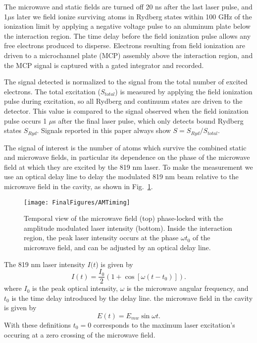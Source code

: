 \documentclass[aps,pra,preprint,groupedaddress]{revtex4-1}
\begin{document}
The microwave and static fields are turned off 20 ns after the last laser pulse, and 1$\mu$s later we field ionize surviving atoms in Rydberg states within 100 GHz of the ionization limit by applying a negative voltage pulse to an aluminum plate below the interaction region. The time delay before the field ionization pulse allows any free electrons produced to disperse. Electrons resulting from field ionization are driven to a microchannel plate (MCP) assembly above the interaction region, and the MCP signal is captured with a gated integrator and recorded.

The signal detected is normalized to the signal from the total number of excited electrons. The total excitation ($S_{total}$) is measured by applying the field ionization pulse during excitation, so all Rydberg and continuum states are driven to the detector. This value is compared to the signal observed when the field ionization pulse occurs 1 $\mu$s after the final laser pulse, which only detects bound Rydberg states $S_{Ryd}$. Signals reported in this paper always show $S = S_{Ryd} / S_{total}$.

The signal of interest is the number of atoms which survive the combined static and microwave fields, in particular its dependence on the phase of the microwave field at which they are excited by the 819 nm laser. To make the measurement we use an optical delay line to delay the modulated 819 nm beam relative to the microwave field in the cavity, as shown in Fig.~\ref{fig:AMLaser}.

\begin{figure}
	\texttt{[image: FinalFigures/AMTiming]}
	\caption{Temporal view of the microwave field (top) phase-locked with the amplitude modulated laser intensity (bottom). Inside the interaction region, the peak laser intensity occurs at the phase $\omega t_0$ of the microwave field, and can be adjusted by an optical delay line.}
	\label{fig:AMLaser}
\end{figure}

The 819 nm laser intensity $I(t$) is given by
\begin{equation}
I(t) =\frac{I_0}{2}(1+\cos{[\omega (t-t_0)]}).
\end{equation}
where $I_0$ is the peak optical intensity, $\omega$ is the microwave angular frequency, and $t_0$ is the time delay introduced by the delay line. the microwave field in the cavity is given by
\begin{equation}
E(t) =E_{mw}\sin{\omega t}.
\end{equation}
With these definitions $t_0=0$ corresponds to the maximum laser excitation's occuring at a zero crossing of the microwave field.
\end{document}

